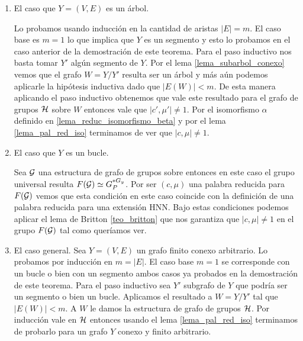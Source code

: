 \documentclass[tesis.tex]{subfiles}
\begin{document}
\begin{enumerate}
		
		\item El caso que $Y = (V,E)$ es un árbol. 
		
		Lo probamos usando inducción en la cantidad de aristas $|E| = m$.
		El caso base es $m=1$ lo que implica que $Y$ es un segmento y esto lo probamos en el caso anterior de la demostración de este teorema.
		Para el paso inductivo nos basta tomar $Y'$ algún segmento de $Y$.
		Por el lema \ref{lema_subarbol_conexo} vemos que el grafo $W = Y / Y'$ resulta ser un árbol y más aún podemos aplicarle la hipótesis inductiva dado que $|E(W)| < m$. 
		De esta manera aplicando el paso inductivo obtenemos que vale este resultado para el grafo de grupos ${\cal H}$  
		sobre $W$  entonces vale que $|c',\mu'| \neq 1$.
		Por el isomorfismo $\alpha$ definido en \ref{lema_reduc_isomorfismo_beta} 
		y por el lema \ref{lema_pal_red_iso} terminamos de ver que $|c, \mu| \neq 1$.
		
		\item El caso que $Y$ es un bucle.
	\begin{center}
	\end{center}
		Sea ${\cal G}$ una estructura de grafo de grupos sobre entonces en este caso el grupo universal resulta $F({\cal G}) \simeq G_P^{\ast G_y}$.
		Por ser $(c, \mu)$ una palabra reducida para $F({\cal G})$ vemos que esta condición en este caso coincide con la definición de una palabra reducida para una extensión HNN.		
		Bajo estas condiciones podemos aplicar el lema de Britton \ref{teo_britton} que nos garantiza que $|c, \mu| \neq 1$ en el grupo $F({\cal G})$ tal como queríamos ver.
		
		\item El caso general. 
		Sea $Y = (V,E)$ un grafo finito conexo arbitrario.
		Lo probamos por inducción en $m = |E|$.
		El caso base $m=1$ se corresponde con un bucle o bien con un segmento ambos casos ya probados en la demostración de este teorema.
		Para el paso inductivo sea $Y'$ subgrafo de $Y$ que podría ser un segmento o bien un bucle. 
		Aplicamos el resultado a $W=Y/Y'$ tal que $|E(W)| < m$.
		A $W$ le damos la estructura de grafo de grupos ${\cal H}$.
		Por inducción vale en ${\cal H}$ 
		entonces usando el lema \ref{lema_pal_red_iso} terminamos de probarlo para un grafo $Y$ conexo y finito arbitrario.
	\end{enumerate}
\end{document}
